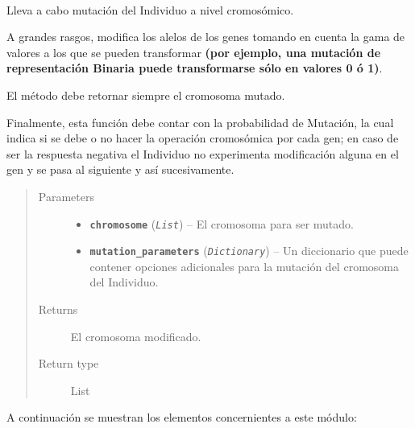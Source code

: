 \documentclass[letterpaper,10pt,english]{sphinxmanual}
\begin{document}
\begin{fulllineitems}
~
\begin{DUlineblock}{0em}
\item[] Lleva a cabo mutación del Individuo a nivel cromosómico.
\item[] A grandes rasgos, modifica los alelos de los genes tomando en cuenta
la gama de valores a los que se pueden transformar \textbf{(por ejemplo, una mutación de representación
Binaria puede transformarse sólo en valores 0 ó 1)}.
\item[] El método debe retornar siempre el cromosoma mutado.
\item[] Finalmente, esta función debe contar con la probabilidad de Mutación,
la cual indica si se debe o no hacer la operación cromosómica por cada gen; en caso
de ser la respuesta negativa el Individuo no experimenta modificación alguna en el gen y
se pasa al siguiente y así sucesivamente.
\end{DUlineblock}
\begin{quote}\begin{description}
\item[{Parameters}] \leavevmode\begin{itemize}
\item {} 
\textbf{\texttt{chromosome}} (\emph{\texttt{List}}) -- El cromosoma para ser mutado.

\item {} 
\textbf{\texttt{mutation\_parameters}} (\emph{\texttt{Dictionary}}) -- Un diccionario que puede contener opciones adicionales para la
mutación del cromosoma del Individuo.

\end{itemize}

\item[{Returns}] \leavevmode
El cromosoma modificado.

\item[{Return type}] \leavevmode
List

\end{description}\end{quote}

\end{fulllineitems}


A continuación se muestran los elementos concernientes a este módulo:
\end{document}
